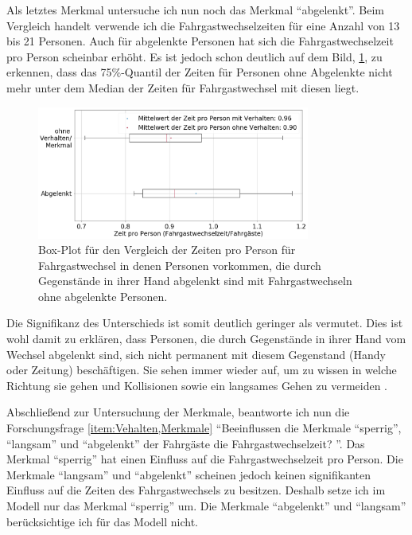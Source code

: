 Als letztes Merkmal untersuche ich nun noch das Merkmal "`abgelenkt"'. Beim Vergleich handelt verwende ich die Fahrgastwechselzeiten für eine Anzahl von 13 bis 21 Personen. Auch für abgelenkte Personen hat sich die Fahrgastwechselzeit pro Person scheinbar erhöht. Es ist jedoch schon deutlich auf dem Bild, \figurename \ref{fig:BoxPlotAbgelenkt}, zu erkennen, dass das 75\%-Quantil der Zeiten für Personen ohne Abgelenkte nicht mehr unter dem Median der Zeiten für Fahrgastwechsel mit diesen liegt.
\begin{figure}[H]
	\centering
		\includegraphics[width=0.8\textwidth]{pictures/data_evaluation/behavior/comp_Abgelenkt.png}
	\caption{Box-Plot für den Vergleich der Zeiten pro Person für Fahrgastwechsel in denen Personen vorkommen, die durch Gegenstände in ihrer Hand abgelenkt sind mit Fahrgastwechseln ohne abgelenkte Personen.}
	\label{fig:BoxPlotAbgelenkt}
\end{figure}
Die Signifikanz des Unterschieds ist somit deutlich geringer als vermutet. Dies ist wohl damit zu erklären, dass Personen, die durch Gegenstände in ihrer Hand vom Wechsel abgelenkt sind, sich nicht permanent mit diesem Gegenstand (\zB Handy oder Zeitung) beschäftigen. Sie sehen immer wieder auf, um zu wissen in welche Richtung sie gehen und Kollisionen sowie ein langsames Gehen zu vermeiden .

Abschließend zur Untersuchung der Merkmale, beantworte ich nun die Forschungsfrage \ref{item:Vehalten,Merkmale} "`Beeinflussen die Merkmale "`sperrig"', "`langsam"' und "`abgelenkt"' der Fahrgäste die Fahrgastwechselzeit? "'. Das Merkmal "`sperrig"' hat einen Einfluss auf die Fahrgastwechselzeit pro Person. Die Merkmale "`langsam"' und "`abgelenkt"' scheinen jedoch keinen signifikanten Einfluss auf die Zeiten des Fahrgastwechsels zu besitzen. Deshalb setze ich im Modell nur das Merkmal "`sperrig"' um. Die Merkmale "`abgelenkt"' und "`langsam"' berücksichtige ich für das Modell nicht. 

